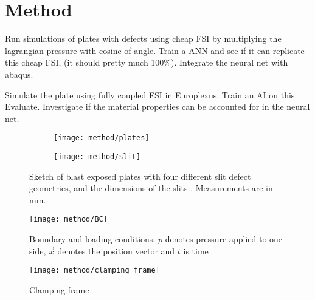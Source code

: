 \chapter{Method} \label{CH4}
Run simulations of plates with defects using cheap FSI by multiplying the lagrangian pressure with cosine of angle. Train a ANN and see if it can replicate this cheap FSI, (it should pretty much 100\%). Integrate the neural net with abaqus.

Simulate the plate using fully coupled FSI in Europlexus. Train an AI on this. Evaluate. Investigate if the material properties can be accounted for in the neural net.

\begin{figure}
    \centering
    \begin{subfigure}[b]{0.6\textwidth}
        \centering
        \texttt{[image: method/plates]}
        \caption{}
        \label{fig:plates}
    \end{subfigure}
    \begin{subfigure}[b]{0.39\textwidth}
        \centering
        \texttt{[image: method/slit]}
        \caption{}
        \label{fig:slit}
    \end{subfigure}
    \caption{Sketch of  blast exposed plates with four different slit defect geometries, and  the dimensions of the slits . Measurements are in mm.}
\end{figure}

\begin{figure}
    \centering
    \texttt{[image: method/BC]}
    \caption{Boundary and loading conditions. $p$ denotes pressure applied to one side, $\vec{x}$ denotes the position vector and $t$ is time}
    \label{fig:bc}
\end{figure}

\begin{figure}
    \centering
    \texttt{[image: method/clamping\_frame]}
    \caption{Clamping frame}
    \label{fig:clamping}
\end{figure}